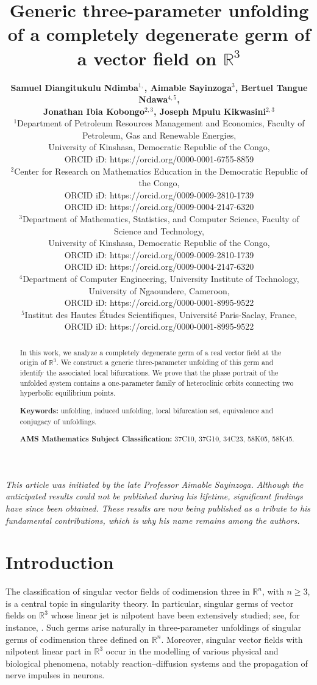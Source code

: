 \documentclass[12pt]{article}
\title{Generic three-parameter unfolding of a completely degenerate germ of a vector field on $\mathbb{R}^3$}
\author[Samuel Diangitukulu Ndimba$^{1,}$, Aimable Sayinzoga$^{3}$, Bertuel Tangue Ndawa$^{4,5}$, Jonathan Ibia Kobongo$^{2,3}$, Joseph Mpulu Kikwasini$^{2,3}$]{
\textbf{Samuel Diangitukulu Ndimba$^{1,}$, Aimable Sayinzoga$^{3}$, Bertuel Tangue Ndawa$^{4,5}$,}\\\textbf{Jonathan Ibia Kobongo$^{2,3}$, Joseph Mpulu Kikwasini$^{2,3}$}\\
$^{1}$Department of Petroleum Resources Management and Economics, Faculty of Petroleum, Gas and Renewable Energies,\\ University of Kinshasa, Democratic Republic of the Congo,\\ ORCID iD: https://orcid.org/0000-0001-6755-8859\\
$^{2}$Center for Research on Mathematics Education in the Democratic Republic of the Congo,\\ORCID iD: https://orcid.org/0009-0009-2810-1739\\ ORCID iD: https://orcid.org/0009-0004-2147-6320\\
$^{3}$Department of Mathematics, Statistics, and Computer Science, Faculty of Science and Technology, \\University of Kinshasa, Democratic Republic of the Congo,\\ORCID iD: https://orcid.org/0009-0009-2810-1739\\ ORCID iD: https://orcid.org/0009-0004-2147-6320\\
$^{4}$Department of Computer Engineering, University Institute of Technology, University of Ngaoundere, Cameroon,\\ ORCID iD: https://orcid.org/0000-0001-8995-9522\\
$^{5}$Institut des Hautes Études Scientifiques, Université Paris-Saclay, France,\\ ORCID iD: https://orcid.org/0000-0001-8995-9522\\
}
\newtheorem{remark definition}{Remark Definition}[section]
\begin{document}
\maketitle



\begin{center}
	\textit{This article was initiated by the late Professor Aimable Sayinzoga.
		Although the anticipated results could not be published during his lifetime,
		significant findings have since been obtained. These results are now being
		published as a tribute to his fundamental contributions, which is why his
		name remains among the authors.}
\end{center}

\vspace{1em}

\begin{abstract}
	In this work, we analyze a completely degenerate germ of a real vector field
	at the origin of $\mathbb{R}^3$. We construct a generic three-parameter
	unfolding of this germ and identify the associated local bifurcations. We
	prove that the phase portrait of the unfolded system contains a
	one-parameter family of heteroclinic orbits connecting two hyperbolic
	equilibrium points.
	
	\medskip
	
	\noindent\textbf{Keywords:} unfolding, induced unfolding, local bifurcation
	set, equivalence and conjugacy of unfoldings.
	
	\medskip
	
	\noindent\textbf{AMS Mathematics Subject Classification:} 37C10, 37G10,
	34C23, 58K05, 58K45.
\end{abstract}

\section{Introduction}

The classification of singular vector fields of codimension three in
$\mathbb{R}^n$, with $n\geq 3$, is a central topic in singularity theory.
In particular, singular germs of vector fields on $\mathbb{R}^3$ whose linear
jet is nilpotent have been extensively studied; see, for instance, \cite{i}.
Such germs arise naturally in three-parameter unfoldings of singular germs of
codimension three defined on $\mathbb{R}^n$. Moreover, singular vector fields
with nilpotent linear part in $\mathbb{R}^3$ occur in the modelling of various
physical and biological phenomena, notably reaction--diffusion systems and the
propagation of nerve impulses in neurons.
\end{document}
